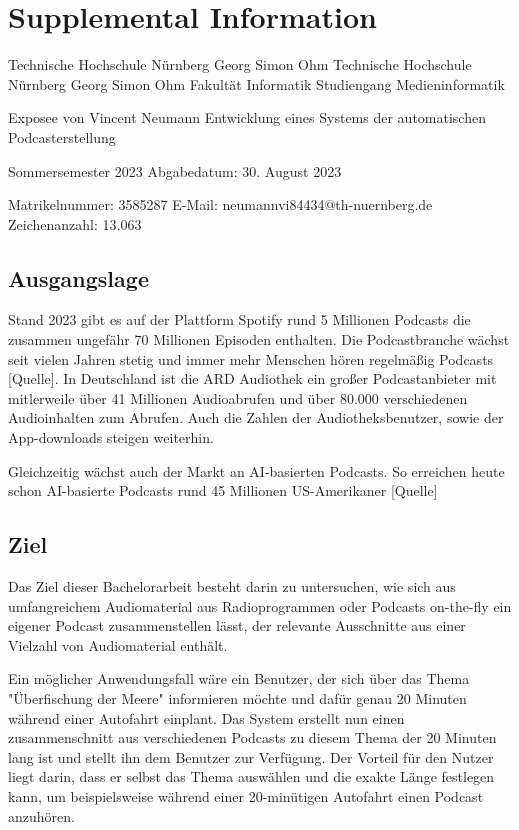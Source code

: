 \chapter{Supplemental Information}\label{app:supplemental-information}




Technische Hochschule Nürnberg Georg Simon Ohm
Technische Hochschule
 Nürnberg 
 Georg Simon Ohm
Fakultät Informatik
Studiengang Medieninformatik

Exposee von 
Vincent Neumann
Entwicklung eines Systems der automatischen Podcasterstellung

Sommersemester 2023
Abgabedatum: 30. August 2023

Matrikelnummer:			3585287
E-Mail:					neumannvi84434@th-nuernberg.de
Zeichenanzahl:				13.063



\section{Ausgangslage}
 
Stand 2023 gibt es auf der Plattform Spotify rund 5 Millionen Podcasts die zusammen ungefähr 70 Millionen Episoden enthalten. Die Podcastbranche wächst seit vielen Jahren stetig und immer mehr Menschen hören regelmäßig Podcasts [Quelle].
In Deutschland ist die ARD Audiothek ein großer Podcastanbieter mit mitlerweile über 41 Millionen Audioabrufen und über 80.000 verschiedenen Audioinhalten zum Abrufen. Auch die Zahlen der Audiotheksbenutzer, sowie der App-downloads steigen weiterhin. 

Gleichzeitig wächst auch der Markt an AI-basierten Podcasts. So erreichen heute schon AI-basierte Podcasts rund 45 Millionen US-Amerikaner [Quelle]


\section{Ziel}


Das Ziel dieser Bachelorarbeit besteht darin zu untersuchen, wie sich aus umfangreichem Audiomaterial aus Radioprogrammen oder Podcasts on-the-fly ein eigener Podcast zusammenstellen lässt, der relevante Ausschnitte aus einer Vielzahl von Audiomaterial enthält.

Ein möglicher Anwendungsfall wäre ein Benutzer, der sich über das Thema "Überfischung der Meere" informieren möchte und dafür genau 20 Minuten während einer Autofahrt einplant. Das System erstellt nun einen zusammenschnitt aus verschiedenen Podcasts zu diesem Thema der 20 Minuten lang ist und stellt ihn dem Benutzer zur Verfügung. Der Vorteil für den Nutzer liegt darin, dass er selbst das Thema auswählen und die exakte Länge festlegen kann, um beispielsweise während einer 20-minütigen Autofahrt einen Podcast anzuhören.

